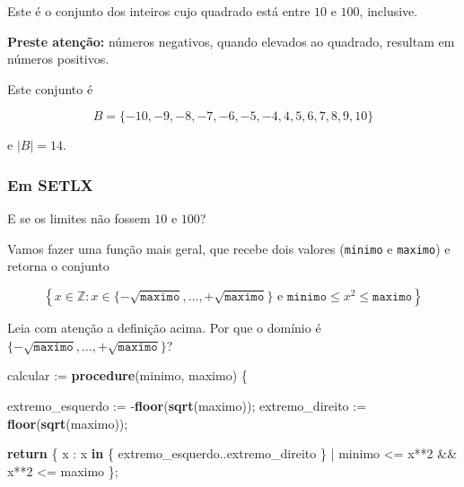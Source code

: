 \documentclass[
  letterpaper,
  DIV=11,
  numbers=noendperiod]{scrreprt}
\newenvironment{Shaded}{\begin{snugshade}}{\end{snugshade}}
\newcommand{\DecValTok}[1]{\textcolor[rgb]{0.00,0.00,0.81}{#1}}
\newcommand{\KeywordTok}[1]{\textcolor[rgb]{0.13,0.29,0.53}{\textbf{#1}}}
\newcommand{\NormalTok}[1]{#1}
\begin{document}
\begin{tcolorbox}[enhanced jigsaw, breakable, toptitle=1mm, opacitybacktitle=0.6, colback=white, toprule=.15mm, left=2mm, rightrule=.15mm, leftrule=.75mm, title={Resposta (b)}, coltitle=black, arc=.35mm, bottomtitle=1mm, opacityback=0, bottomrule=.15mm, colframe=quarto-callout-important-color-frame, titlerule=0mm, colbacktitle=quarto-callout-important-color!10!white]

Este é o conjunto dos inteiros cujo quadrado está entre $10$ e $100$,
inclusive.

\textbf{Preste atenção:} números negativos, quando elevados ao quadrado,
resultam em números positivos.

Este conjunto é

\[
B = \{ -10, -9, -8, -7, -6, -5, -4, 4, 5, 6, 7, 8, 9, 10 \}
\]

e $|B| = 14$.

\subsubsection*{Em SETLX}\label{em-setlx-3}

E se os limites não fossem $10$ e $100$?

Vamos fazer uma função mais geral, que recebe dois valores
(\texttt{minimo} e \texttt{maximo}) e retorna o conjunto

\[
\left\{ 
x \in \mathbb{Z}: 
x \in \{ -\sqrt{\texttt{maximo}}, \ldots, +\sqrt{\texttt{maximo}} \}
\text{ e } \texttt{minimo} \leq x^2 \leq \texttt{maximo}
\right\}
\]

Leia com atenção a definição acima. Por que o domínio é
$\{ -\sqrt{\texttt{maximo}}, \ldots, +\sqrt{\texttt{maximo}} \}$?

\begin{Shaded}
\begin{Highlighting}[]
\NormalTok{calcular := }\KeywordTok{procedure}\NormalTok{(minimo, maximo) \{}
  
\NormalTok{  extremo\_esquerdo := {-}}\KeywordTok{floor}\NormalTok{(}\KeywordTok{sqrt}\NormalTok{(maximo));}
\NormalTok{  extremo\_direito  :=  }\KeywordTok{floor}\NormalTok{(}\KeywordTok{sqrt}\NormalTok{(maximo));}
  
  \KeywordTok{return}\NormalTok{ \{ }
\NormalTok{    x : }
\NormalTok{      x }\KeywordTok{in}\NormalTok{ \{ extremo\_esquerdo..extremo\_direito \} |}
\NormalTok{        minimo \textless{}= x**}\DecValTok{2}\NormalTok{ \&\& x**}\DecValTok{2}\NormalTok{ \textless{}= maximo}
\NormalTok{  \};}
  

\end{Highlighting}
\end{Shaded}
\end{tcolorbox}
\end{document}
